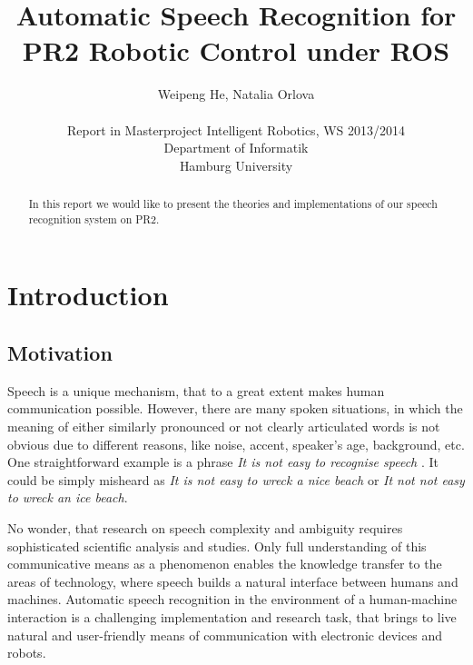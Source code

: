 \documentclass[11pt,a4paper]{report}
\begin{document}
 \title{Automatic Speech Recognition for PR2 Robotic Control under ROS} 
\author{Weipeng He, Natalia Orlova \\ \\
\small Report in Masterproject Intelligent Robotics, WS 2013/2014\\
Department of Informatik\\ Hamburg University\\[4mm]}
\maketitle

\begin{abstract}
  In this report we would like to present the theories and implementations of our speech recognition system on PR2. 
\end{abstract}

\tableofcontents

\chapter{Introduction}
\label{sec:intro}

\section{Motivation}
Speech is a unique mechanism, that to a great extent makes human
communication possible. However, there are many spoken situations, in which
the meaning of  either similarly pronounced or  not clearly
articulated words is not obvious due to different reasons, like noise, accent,
speaker's age, background, etc. One straightforward example is  a phrase \textit
{It is not easy to recognise speech} . It could be simply misheard as \textit
{It is not easy to wreck a nice beach} or \textit {It not not easy to wreck an
ice beach}.

 No wonder, that research on speech complexity and
ambiguity requires sophisticated scientific analysis and studies. Only full 
understanding of this communicative means as a phenomenon enables the 
knowledge transfer to the areas of technology, where speech builds a natural
 interface between humans and machines.  Automatic speech recognition in the 
 environment of a human-machine interaction  is a challenging implementation and
 research task, that brings to live natural and user-friendly means of communication with electronic devices and robots. 
\end{document}
